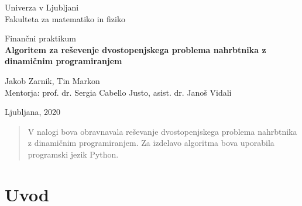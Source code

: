 \documentclass[a4paper, 11pt]{article}
\begin{document}
		\begin{titlepage}
			\begin{center}

			\large
			Univerza v Ljubljani\\
				\normalsize
				Fakulteta za matematiko in fiziko\\

			\vspace{5 cm} 

				\large
				Finančni praktikum\\


			\vspace{0.5cm}
			\LARGE
				\textbf{Algoritem za reševenje dvostopenjskega problema nahrbtnika z dinamičnim programiranjem}

			\vspace{0.5 cm}

			\large
				Jakob Zarnik, Tin Markon \\


			\vspace{1.5cm}
			\normalsize
				Mentorja: prof. dr. Sergia Cabello Justo, asist. dr. Janoš Vidali
			\vspace{3cm}


			\vfill

				\large Ljubljana, 2020

			\end{center}
		\end{titlepage}


\newpage

\tableofcontents
\vspace{22mm}

\newpage
		
	\pagestyle{fancy}
	\fancyhead{}
	\fancyfoot{}
	\fancyfoot[R]{\thepage}
	
	\begin{abstract}
	
	V nalogi bova obravnavala reševanje dvostopenjskega problema nahrbtnika z dinamičnim programiranjem. Za izdelavo algoritma bova uporabila programski jezik Python.
	
	\end{abstract}
	
	\pagebreak
	
	\section{Uvod}
	
\end{document}
